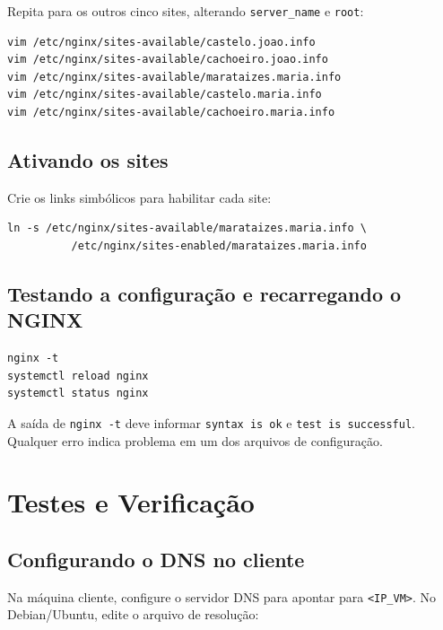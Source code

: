 \documentclass[11pt,a4paper]{article}
\begin{document}
Repita para os outros cinco sites, alterando \texttt{server\_name} e \texttt{root}:

\begin{lstlisting}[style=bash]
vim /etc/nginx/sites-available/castelo.joao.info
vim /etc/nginx/sites-available/cachoeiro.joao.info
vim /etc/nginx/sites-available/marataizes.maria.info
vim /etc/nginx/sites-available/castelo.maria.info
vim /etc/nginx/sites-available/cachoeiro.maria.info
\end{lstlisting}

\subsection{Ativando os sites}

Crie os links simbólicos para habilitar cada site:

\begin{lstlisting}[style=bash]
    ln -s /etc/nginx/sites-available/marataizes.maria.info \
          /etc/nginx/sites-enabled/marataizes.maria.info
\end{lstlisting}

\subsection{Testando a configuração e recarregando o NGINX}

\begin{lstlisting}[style=bash]
nginx -t
systemctl reload nginx
systemctl status nginx
\end{lstlisting}

\begin{successbox}
  A saída de \texttt{nginx -t} deve informar \texttt{syntax is ok} e \texttt{test is successful}. Qualquer erro indica problema em um dos arquivos de configuração.
\end{successbox}

\section{Testes e Verificação}

\subsection{Configurando o DNS no cliente}

Na máquina cliente, configure o servidor DNS para apontar para \texttt{<IP\_VM>}.
No Debian/Ubuntu, edite o arquivo de resolução:
\end{document}
